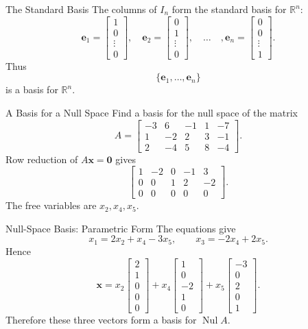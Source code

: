 \documentclass[aspectratio=169]{beamer}
\newcommand{\R}{\mathbb{R}}
\newcommand{\vect}[1]{\mathbf{#1}}
\newcommand{\Nul}{\operatorname{Nul}}
\begin{document}
\begin{frame}{The Standard Basis}
The columns of $I_n$ form the standard basis for $\R^n$:
\[
\vect e_1=\begin{bmatrix}1\\0\\\vdots\\0\end{bmatrix},
\quad
\vect e_2=\begin{bmatrix}0\\1\\\vdots\\0\end{bmatrix},
\quad\ldots\quad,
\vect e_n=\begin{bmatrix}0\\0\\\vdots\\1\end{bmatrix}.
\]
Thus
\[
\{\vect e_1,\ldots,\vect e_n\}
\]
is a basis for $\R^n$.
\end{frame}

\begin{frame}{A Basis for a Null Space}
Find a basis for the null space of the matrix
\[
A=\begin{bmatrix}
-3&6&-1&1&-7\\
1&-2&2&3&-1\\
2&-4&5&8&-4
\end{bmatrix}.
\]
Row reduction of $A\vect x=\vect0$ gives
\[
\begin{bmatrix}
1&-2&0&-1&3\\
0&0&1&2&-2\\
0&0&0&0&0
\end{bmatrix}.
\]
The free variables are $x_2,x_4,x_5$.
\end{frame}

\begin{frame}{Null-Space Basis: Parametric Form}
The equations give
\[
x_1=2x_2+x_4-3x_5,
\qquad
x_3=-2x_4+2x_5.
\]
Hence
\[
\vect x=x_2\begin{bmatrix}2\\1\\0\\0\\0\end{bmatrix}
+x_4\begin{bmatrix}1\\0\\-2\\1\\0\end{bmatrix}
+x_5\begin{bmatrix}-3\\0\\2\\0\\1\end{bmatrix}.
\]
Therefore these three vectors form a basis for $\Nul A$.
\end{frame}
\end{document}
